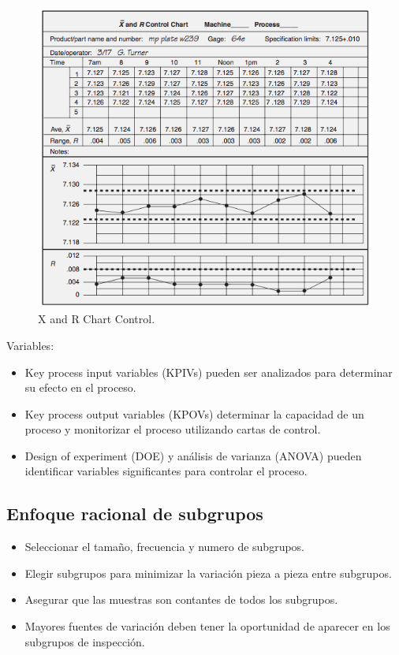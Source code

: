 \documentclass[]{article}
\begin{document}
\begin{figure}[H]
	\centering
	\includegraphics[width=120mm]{imagenes/XandRControl.png}
	\caption{X and R Chart Control.}
	\label{fig:XandRControl}
\end{figure}

Variables:
\begin{itemize}
	\item Key process input variables (KPIVs) pueden ser analizados para determinar su efecto en el proceso.
	\item Key process output variables (KPOVs) determinar la capacidad de un proceso y monitorizar el proceso utilizando cartas de control.
	\item Design of experiment (DOE) y análisis de varianza (ANOVA) pueden identificar variables significantes para controlar el proceso.
\end{itemize}

\subsection{Enfoque racional de subgrupos}

\begin{itemize}
	\item Seleccionar el tamaño, frecuencia y numero de subgrupos.
	\item Elegir subgrupos para minimizar la variación pieza a pieza entre subgrupos.
	\item Asegurar que las muestras son contantes de todos los subgrupos.
	\item Mayores fuentes de variación deben tener la oportunidad de aparecer en los subgrupos de inspección.
\end{itemize}
\end{document}
